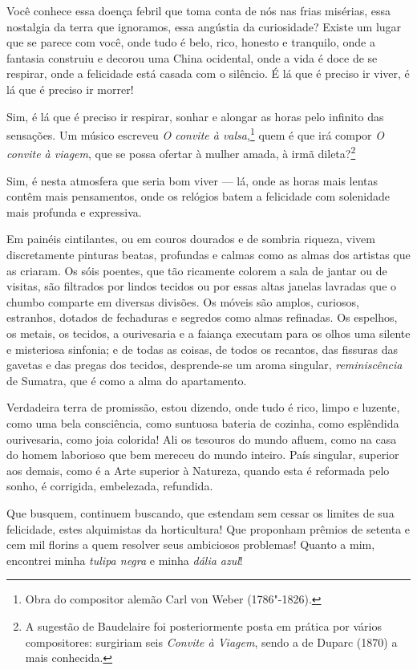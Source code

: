 Você conhece essa doença febril que toma conta de nós nas frias
misérias, essa nostalgia da terra que ignoramos, essa angústia da
curiosidade? Existe um lugar que se parece com você, onde tudo é
belo, rico, honesto e tranquilo, onde a fantasia construiu e decorou
uma China ocidental, onde a vida é doce de se respirar, onde a
felicidade está casada com o silêncio. É lá que é preciso ir viver, é
lá que é preciso ir morrer!

Sim, é lá que é preciso ir respirar, sonhar e alongar as horas pelo
infinito das sensações. Um músico escreveu \textit{O convite à
valsa},\protect\footnote{ Obra do compositor alemão Carl von Weber (1786"-1826).}
quem é que irá compor \textit{O convite à
viagem}, que se possa ofertar à mulher amada, à irmã
dileta?\protect\footnote{ A sugestão de Baudelaire foi posteriormente posta em prática por
vários compositores: surgiriam seis \textit{Convite à Viagem}, sendo a de Duparc (1870) a
mais conhecida.}

Sim, é nesta atmosfera que seria bom viver --- lá, onde as horas mais
lentas contêm mais pensamentos, onde os relógios batem a felicidade
com solenidade mais profunda e expressiva.

Em painéis cintilantes, ou em couros dourados e de sombria riqueza,
vivem discretamente pinturas beatas, profundas e calmas como as almas
dos artistas que as criaram. Os sóis poentes, que tão ricamente colorem
a sala de jantar ou de visitas, são filtrados por lindos tecidos ou por
essas altas janelas lavradas que o chumbo comparte em diversas
divisões. Os móveis são amplos, curiosos, estranhos, dotados de
fechaduras e segredos como almas refinadas. Os espelhos, os metais, os
tecidos, a ourivesaria e a faiança executam para os olhos uma
silente e misteriosa sinfonia; e de todas as coisas, de todos os recantos, das
fissuras das gavetas e das pregas dos tecidos, desprende-se um aroma
singular, \textit{reminiscência} de Sumatra, que é como a alma do apartamento.

Verdadeira terra de promissão, estou dizendo, onde tudo é rico,
limpo e luzente, como uma bela consciência, como suntuosa bateria
de cozinha, como esplêndida ourivesaria, como joia colorida!
Ali os tesouros do mundo afluem, como na casa do homem laborioso
que bem mereceu do mundo inteiro. País singular, superior aos demais,
como é a Arte superior à Natureza, quando esta é reformada pelo sonho,
é corrigida, embelezada, refundida.

Que busquem, continuem buscando, que estendam sem cessar os limites de
sua felicidade, estes alquimistas da horticultura! Que proponham
prêmios de setenta e cem mil florins a quem resolver seus
ambiciosos problemas! Quanto a mim, encontrei minha \textit{tulipa negra} e
minha \textit{dália azul}!

